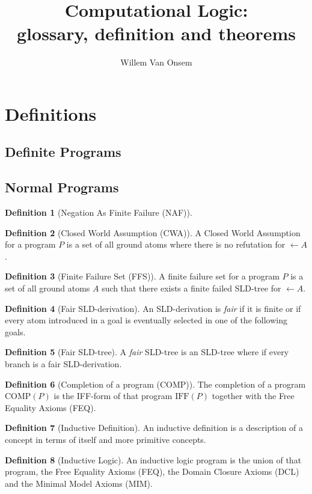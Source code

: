 \documentclass{article}
\title{Computational Logic:\\glossary, definition and theorems}
\author{Willem Van Onsem}
\newcommand{\brak}[1]{\ensuremath{\left(#1\right)}}
\newcommand{\fun}[2]{\ensuremath{#1\brak{#2}}}
\newcommand{\funm}[2]{\ensuremath{\fun{\mbox{#1}}{#2}}}
\theoremstyle{definition}
\newtheorem{definition}{Definition}
\theoremstyle{plain}
\begin{document}
\maketitle
\tableofcontents
\section{Definitions}
\subsection{Definite Programs}
\subsection{Normal Programs}
\begin{definition}[Negation As Finite Failure (NAF)]
 
\end{definition}
\begin{definition}[Closed World Assumption (CWA)]
A Closed World Assumption for a program $P$ is a set of all ground atoms where there is no refutation for $\leftarrow A$.
\end{definition}
\begin{definition}[Finite Failure Set (FFS)]
A finite failure set for a program $P$ is a set of all ground atoms $A$ such that there exists a finite failed SLD-tree for $\leftarrow A$.
\end{definition}
\begin{definition}[Fair SLD-derivation]
An SLD-derivation is \emph{fair} if it is finite or if every atom introduced in a goal is eventually selected in one of the following goals.
\end{definition}
\begin{definition}[Fair SLD-tree]
A \emph{fair} SLD-tree is an SLD-tree where if every branch is a fair SLD-derivation.
\end{definition}
\begin{definition}[Completion of a program (COMP)]
The completion of a program $\funm{COMP}{P}$ is the IFF-form of that program $\funm{IFF}{P}$ together with the Free Equality Axioms (FEQ).
\end{definition}
\begin{definition}[Inductive Definition]
An inductive definition is a description of a concept in terms of itself and more primitive concepts.
\end{definition}
\begin{definition}[Inductive Logic]
An inductive logic program  is the union of that program, the Free Equality Axioms (FEQ), the Domain Closure Axioms (DCL) and the Minimal Model Axioms (MIM).
\end{definition}
\end{document}
